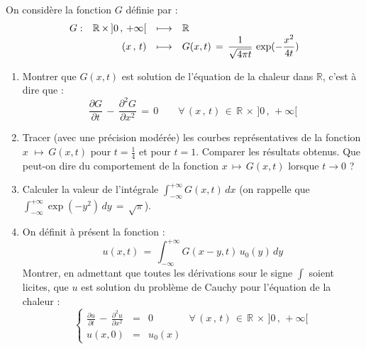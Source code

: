 \documentclass[leqno,11pt]{article}
\newcommand{\RR}{{\mathbb R}}
\newcommand{\ds}{\displaystyle}
\begin{document}
On consid\`ere la fonction $G$ d\'efinie par :
$$
\begin{array}{rrcl}
\ds G : & \RR \, \times \, ]0 \, , \, +\infty[ & \longmapsto & \RR \\
\ds & (x \, , \, t) & \longmapsto & \ds G(x,t) \, = \, \frac{1}{\sqrt{4 \pi t}}\, \exp (-\frac{x^2}{4t})
\end{array}
$$
\begin{enumerate}
\item Montrer que $G(x,t)$ est solution de l'\'equation de la chaleur dans $\RR$, c'est \`a dire que :
$$
\frac{\partial G}{\partial t} \, - \, \frac{\partial^2 G}{\partial x^2} \, = \, 0 \qquad \forall \, (x \, , \, t ) \, \in \, \RR \, \times \, ]0 \, , \, + \infty[
$$
\item Tracer (avec une  pr\'ecision mod\'er\'ee) les courbes repr\'esentatives de la fonction $\ds x \, \, \longmapsto \,G(x,t)$ pour $\ds t = \frac{1}{4}$ et pour $t=1$. Comparer les r\'esultats obtenus. Que peut-on dire du comportement de la fonction  $\ds x  \, \longmapsto \,G(x,t)$ lorsque $t \to 0$ ?
\item Calculer la valeur de l'int\'egrale $\ds \int_{-\infty}^{+\infty} G(x,t) \, dx$ (on rappelle que  $\ds \int_{-\infty}^{+\infty} \exp(-y^2) \, dy \, = \, \sqrt{\pi} $).
\item On d\'efinit \`a pr\'esent la fonction :
$$
u(x,t) \, = \, \int_{-\infty}^{+\infty} G(x-y,t) \, u_0(y) \, dy
$$
Montrer, en admettant que toutes les d\'erivations sour le signe $\ds \int$ soient licites, que $u$ est solution du probl\`eme de Cauchy pour l'\'equation de la chaleur :
$$
\left\{
\begin{array}{rcll}
\ds \frac{\partial u}{\partial t} \, - \, \frac{\partial^2 u}{\partial x^2} & = & 0 &  \forall \, (x \, , \, t ) \, \in \, \RR \, \times \, ]0 \, , \, + \infty[ \\
\ds u(x,0)&=&\ds u_0(x)&
\end{array}
\right.
$$
\end{enumerate}
\end{document}
